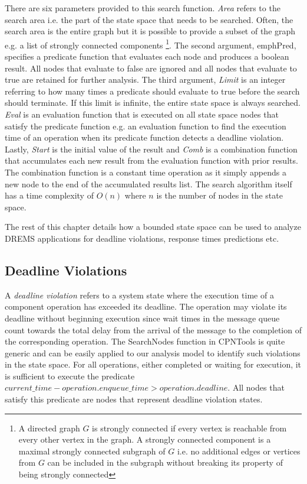 There are six parameters provided to this search function. \emph{Area} refers to the search area i.e. the part of the state space that needs to be searched. Often, the search area is the entire graph but it is possible to provide a subset of the graph e.g. a list of strongly connected components \footnote{A directed graph $G$ is strongly connected if every vertex is reachable from every other vertex in the graph. A strongly connected component is a maximal strongly connected subgraph of $G$ i.e. no additional edges or vertices from $G$ can be included in the subgraph without breaking its property of being strongly connected}. The second argument, emph{Pred}, specifies a predicate function that evaluates each node and produces a boolean result. All nodes that evaluate to false are ignored and all nodes that evaluate to true are retained for further analysis. The third argument, \emph{Limit} is an integer referring to how many times a predicate should evaluate to true before the search should terminate. If this limit is infinite, the entire state space is always searched. \emph{Eval} is an evaluation function that is executed on all state space nodes that satisfy the predicate function e.g. an evaluation function to find the execution time of an operation when its predicate function detects a deadline violation. Lastly, \emph{Start} is the initial value of the result and \emph{Comb} is a combination function that accumulates each new result from the evaluation function with prior results. The combination function is a constant time operation as it simply appends a new node to the end of the accumulated results list. The search algorithm itself has a time complexity of $O(n)$ where $n$ is the number of nodes in the state space. 

The rest of this chapter details how a bounded state space can be used to analyze DREMS applications for deadline violations, response times predictions etc. 

\subsection{Deadline Violations}

A \emph{deadline violation} refers to a system state where the execution time of a component operation has exceeded its deadline. The operation may violate its deadline without beginning execution since wait times in the message queue count towards the total delay from the arrival of the message to the completion of the corresponding operation. The SearchNodes function in CPNTools is quite generic and can be easily applied to our analysis model to identify such violations in the state space. For all operations, either completed or waiting for execution, it is sufficient to execute the predicate $current\_time - operation.enqueue\_time > operation.deadline$. All nodes that satisfy this predicate are nodes that represent deadline violation states. 

